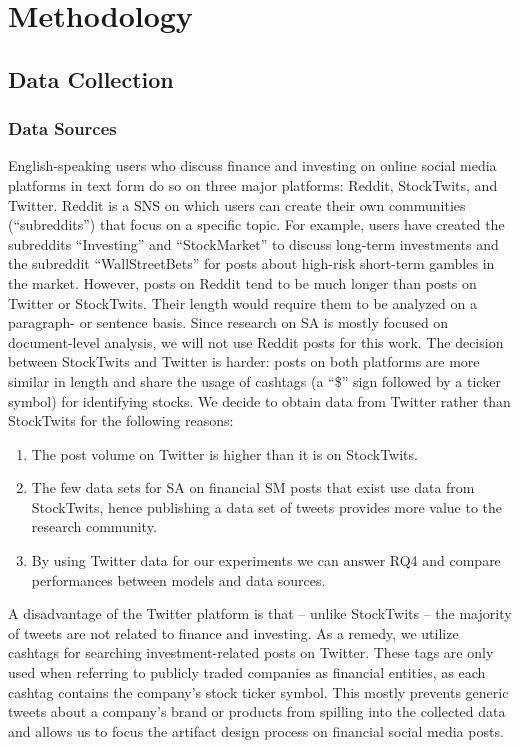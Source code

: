 \section{Methodology}
\subsection{Data Collection}
\subsubsection{Data Sources}
English-speaking users who discuss finance and investing on online social media platforms in text form do so on three major platforms: Reddit, StockTwits, and Twitter. Reddit is a SNS on which users can create their own communities (``subreddits'') that focus on a specific topic. For example, users have created the subreddits ``Investing'' and ``StockMarket'' to discuss long-term investments and the subreddit ``WallStreetBets'' for posts about high-risk short-term gambles in the market. However, posts on Reddit tend to be much longer than posts on Twitter or StockTwits. Their length would require them to be analyzed on a paragraph- or sentence basis. Since research on SA is mostly focused on document-level analysis, we will not use Reddit posts for this work. The decision between StockTwits and Twitter is harder: posts on both platforms are more similar in length and share the usage of cashtags (a ``\$'' sign followed by a ticker symbol) for identifying stocks. We decide to obtain data from Twitter rather than StockTwits for the following reasons:
\begin{enumerate}[noitemsep]
	\item The post volume on Twitter is higher than it is on StockTwits.
	\item The few data sets for SA on financial SM posts that exist use data from StockTwits, hence publishing a data set of tweets provides more value to the research community.
	\item By using Twitter data for our experiments we can answer RQ4 and compare performances between models and data sources.
\end{enumerate}

A disadvantage of the Twitter platform is that -- unlike StockTwits -- the majority of tweets are not related to finance and investing. As a remedy, we utilize cashtags for searching investment-related posts on Twitter. These tags are only used when referring to publicly traded companies as financial entities, as each cashtag contains the company's stock ticker symbol. This mostly prevents generic tweets about a company's brand or products from spilling into the collected data and allows us to focus the artifact design process on financial social media posts.

